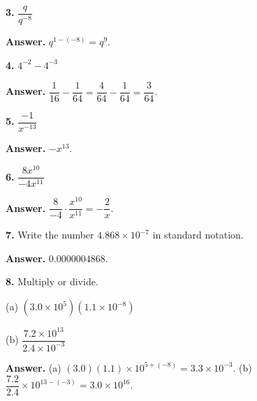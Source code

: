 \documentclass{ximera}
\begin{document}
\begin{problem}

\textbf{3.} $\dfrac{q}{q^{-8}}$

\begin{hint}
\textbf{Answer.} $q^{1-(-8)}=q^{9}$.
\end{hint}
\end{problem}

\begin{problem}

\textbf{4.} $4^{-2}-4^{-3}$

\begin{hint}
\textbf{Answer.} $\dfrac{1}{16}-\dfrac{1}{64}=\dfrac{4}{64}-\dfrac{1}{64}=\dfrac{3}{64}$.
\end{hint}
\end{problem}

\begin{problem}

\textbf{5.} $\dfrac{-1}{x^{-13}}$

\begin{hint}
\textbf{Answer.} $-x^{13}$.
\end{hint}
\end{problem}

\begin{problem}

\textbf{6.} $\dfrac{8x^{10}}{-4x^{11}}$

\begin{hint}
\textbf{Answer.} $\dfrac{8}{-4}\cdot\dfrac{x^{10}}{x^{11}} = -\dfrac{2}{x}$.
\end{hint}
\end{problem}

\begin{problem}

\textbf{7.} Write the number $4.868 \times 10^{-7}$ in standard notation.

\begin{hint}
\textbf{Answer.} $0.0000004868$.
\end{hint}
\end{problem}

\begin{problem}

\textbf{8.} Multiply or divide.

(a) $\left(3.0 \times 10^{5}\right)\left(1.1 \times 10^{-8}\right)$

(b) $\dfrac{7.2 \times 10^{13}}{2.4 \times 10^{-3}}$

\begin{hint}
\textbf{Answer.} (a) $(3.0)(1.1)\times 10^{5+(-8)} = 3.3 \times 10^{-3}$.
(b) $\dfrac{7.2}{2.4}\times 10^{13-(-3)} = 3.0 \times 10^{16}$.
\end{hint}
\end{problem}
\end{document}
